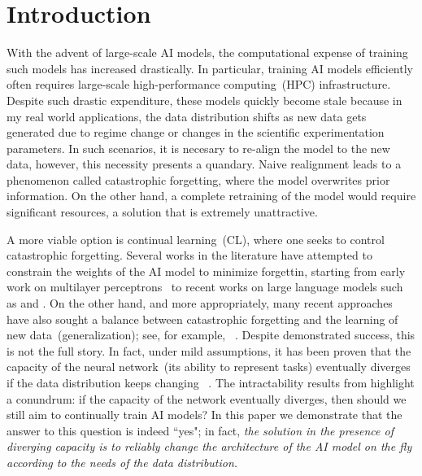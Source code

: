 \section{Introduction}
With the advent of large-scale AI models, the computational expense of training such models has increased drastically. In particular, training AI models efficiently often requires large-scale high-performance computing~(HPC) infrastructure. Despite such drastic expenditure, these models quickly become stale because in my real world applications, the data distribution shifts as new data gets generated due to regime change or changes in the scientific experimentation parameters.  In such scenarios, it is necesary to re-align the model to the new data, however, this necessity presents a quandary. Naive realignment leads to a phenomenon called catastrophic forgetting, where the model overwrites prior information. On the other hand, a complete retraining of the model would require significant resources, a solution that is extremely unattractive. 

A more viable option is continual learning~(CL), where one seeks to control catastrophic forgetting. Several works in the literature have attempted to constrain the weights of the AI model to minimize forgettin, starting from early work on multilayer perceptrons~\cite{mccloskey1989catastrophic} to recent works on large language models such as \cite{luo2025empirical, lai2025reinforcement, biderman2024lora} and \cite{lin2025continual}. On the other hand, and more appropriately, many recent approaches have also sought a balance between catastrophic forgetting and the learning of new data~(generalization); see, for example, ~\cite{raghavan2021formalizing, lu2025rethinking,Lin2023Theory}. Despite demonstrated success, this is not the full story. In fact,  under mild assumptions, it has been proven that the capacity of the neural network~(its ability to represent tasks) eventually diverges if the data distribution keeps changing ~\cite{chakraborty2025understanding}. The intractability results from \cite{chakraborty2025understanding} highlight a conundrum:  if the capacity of the network eventually diverges, then should we still aim to continually train AI models? In this paper we demonstrate that the answer to this question is indeed ``yes"; in fact, \textit{the solution in the presence of diverging capacity is to reliably change the architecture of the AI model on the fly according to the needs of the data distribution.} 

